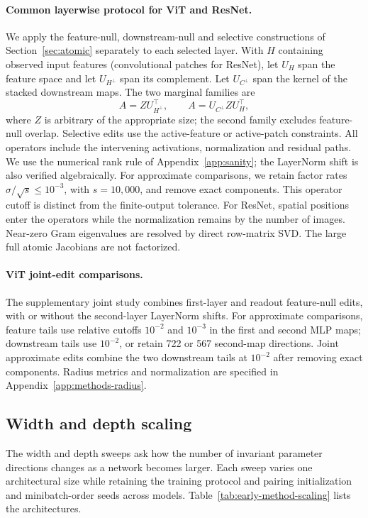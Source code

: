 \paragraph{Common layerwise protocol for ViT and ResNet.}\label{app:methods-common-families}
We apply the feature-null, downstream-null and selective constructions of Section~\ref{sec:atomic} separately to each selected layer. With $H$ containing observed input features (convolutional patches for ResNet), let $U_H$ span the feature space and let $U_{H^\perp}$ span its complement. Let $U_{C^\perp}$ span the kernel of the stacked downstream maps. The two marginal families are
\[
 A=Z U_{H^\perp}^{\top},\qquad A=U_{C^\perp}Z U_H^{\top},
\]
where $Z$ is arbitrary of the appropriate size; the second family excludes feature-null overlap. Selective edits use the active-feature or active-patch constraints. All operators include the intervening activations, normalization and residual paths. We use the numerical rank rule of Appendix~\ref{app:sanity}; the LayerNorm shift is also verified algebraically. For approximate comparisons, we retain factor rates $\sigma/\sqrt{s}\le10^{-3}$, with $s=10,000$, and remove exact components. This operator cutoff is distinct from the finite-output tolerance. For ResNet, spatial positions enter the operators while the normalization remains by the number of images. Near-zero Gram eigenvalues are resolved by direct row-matrix SVD. The large full atomic Jacobians are not factorized.

\paragraph{ViT joint-edit comparisons.}
The supplementary joint study combines first-layer and readout feature-null edits, with or without the second-layer LayerNorm shifts. For approximate comparisons, feature tails use relative cutoffs $10^{-2}$ and $10^{-3}$ in the first and second MLP maps; downstream tails use $10^{-2}$, or retain 722 or 567 second-map directions. Joint approximate edits combine the two downstream tails at $10^{-2}$ after removing exact components. Radius metrics and normalization are specified in Appendix~\ref{app:methods-radius}.

\subsection{Width and depth scaling}
\label{app:methods-scaling}
The width and depth sweeps ask how the number of invariant parameter directions changes as a network becomes larger. Each sweep varies one architectural size while retaining the training protocol and pairing initialization and minibatch-order seeds across models. Table~\ref{tab:early-method-scaling} lists the architectures.

